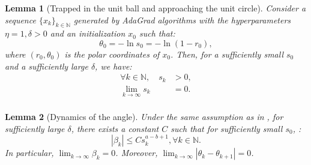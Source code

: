 \documentclass[10pt,a4paper]{amsart}
\newtheorem{lemma}{Lemma}
\newcommand*{\NN}{\mathbb{N}}
\begin{document}
\begin{lemma}[Trapped in the unit ball and approaching the unit circle]
    \label{lemma:trapping-approaching}
    Consider a sequence $\{x_k\}_{k \in \NN}$ generated by AdaGrad algorithms with the hyperparameters $\eta = 1, \delta > 0$ and an initialization $x_0$ such that:
    \begin{equation*}
        \theta_0 = - \ln s_0 = - \ln (1 - r_0), 
    \end{equation*}
    where $(r_0, \theta_0)$ is the polar coordinates of $x_0$.
    Then, for a sufficiently small $s_0$ and a sufficiently large $\delta$, we have:
    \begin{equation*}
        \begin{aligned}
             \forall k \in \NN, \quad s_k &> 0,\\
            \lim_{k \to \infty} s_k &= 0.\\
        \end{aligned}
    \end{equation*}
\end{lemma}

\begin{lemma}[Dynamics of the angle]
    \label{lemma:dynamics-angle}
    Under the same assumption as in , for sufficiently large $\delta$, there exists a constant $C$ such that for sufficiently small $s_0$, :
    \begin{equation*}
        |\beta_k| \leq C s_k^{a - b + 1}, \forall k \in \NN.
    \end{equation*}
    In particular, $\lim_{k \to \infty} \beta_k = 0$. Moreover, $\lim_{k \to \infty} |\theta_k - \theta_{k+1}| = 0$.
\end{lemma}
\end{document}
